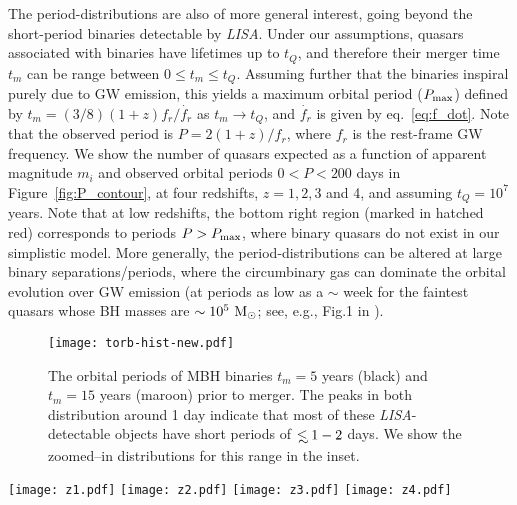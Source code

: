\documentclass[fleqn,usenatbib]{mnras}
\newcommand\lsim{\mathrel{\rlap{\lower4pt\hbox{\hskip1pt$\sim$}}
        \raise1pt\hbox{$<$}}}
\begin{document}
The period-distributions are also of more general interest, going beyond the short-period binaries detectable by {\it LISA}.  Under our assumptions, quasars associated with binaries have lifetimes up to $t_Q$, and therefore their merger time $t_m$ can be range between $0\leq t_m \leq t_Q$.  Assuming further that the binaries inspiral purely due to GW emission, this yields a maximum orbital period ($P_{\rm max}$) defined by $t_m=(3/8)(1+z)f_r/\dot{f_r}$ as $t_m\rightarrow t_Q$, and $\dot{f_r}$ is given by eq.~\ref{eq:f_dot}.  Note that the observed period is $P=2(1+z)/f_r$, where $f_r$ is the rest-frame GW frequency. We show the number of quasars expected as a function of apparent magnitude $m_i$ and observed orbital periods  $0<P<200$ days in Figure~\ref{fig:P_contour}, at four redshifts, $z = 1,2,3$ and 4, and assuming $t_Q=10^7$ years. Note that at low redshifts, the bottom right region (marked in hatched red) corresponds to periods $P>P_{\rm max}$, where binary quasars do not exist in our simplistic model.   More generally, the period-distributions can be altered at large binary separations/periods, where the circumbinary gas can dominate the orbital evolution over GW emission (at periods as low as a $\sim$ week for the faintest quasars whose BH masses are $\sim10^5~{\rm M_\odot}$; see, e.g., Fig.1 in \citealt{Haiman2009a}).

\begin{figure}
    \centering
    \texttt{[image: torb-hist-new.pdf]}
    \caption{The orbital periods of MBH binaries $t_m=5$ years (black) and $t_m=15$ years (maroon)  prior to merger. The peaks in both distribution around 1 day indicate that most of these {\it LISA}-detectable objects have short periods of $\lsim 1-2$ days. We show the zoomed--in distributions for this range in the inset. }
    \label{fig:torb}
\end{figure}

\begin{figure*}
    \centering
    \texttt{[image: z1.pdf]}
    \texttt{[image: z2.pdf]}
    \hfill
    \texttt{[image: z3.pdf]}
    \texttt{[image: z4.pdf]}
    \caption{Expected number of quasars, $N$ (log-scale), as a function of apparent magnitude $m_i$ and observed orbital period $P$ at four different redshifts $z = 1, 2, 3$ and 4. The contours are in units of per magnitude per redshift per day, and the period-distribution assumes the binaries are inspiralling due to GWs. Binary quasars in the lower right at $z=1$ and $z=2$ (shown in hatched red) have GW inspiral times longer than the fiducial quasar lifetime of $t_Q=10^7$ years and do not exist in our simple population model.}
    \label{fig:P_contour}
\end{figure*}
\end{document}
